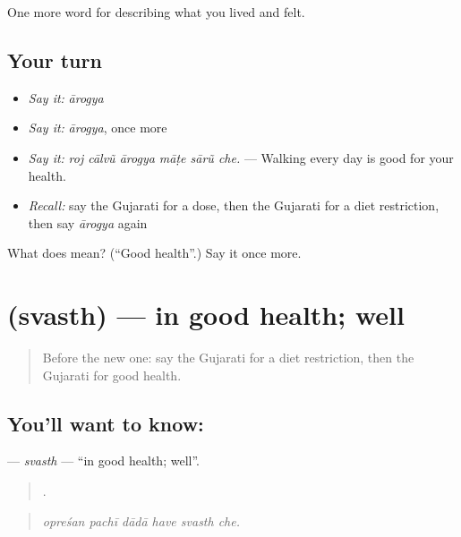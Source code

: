 \begin{grammarlens}[title={What you've built}]
One more word for describing what you lived and felt.
\end{grammarlens}

\subsection*{Your turn}
\begin{itemize}
\raggedright
  \item \emph{Say it:} \emph{ārogya}
  \item \emph{Say it:} \emph{ārogya}, once more
  \item \emph{Say it:} \emph{roj cālvũ ārogya māṭe sārũ che.} — Walking every day is good for your health.
  \item \emph{Recall:} say the Gujarati for a dose, then the Gujarati for a diet restriction, then say \emph{ārogya} again
\end{itemize}

\begin{tcolorbox}[breakable,colback=teal!4,colframe=teal!35!black,title={Before you move on}]
What does  mean? (\textquotedblleft{}Good health\textquotedblright{}.) Say it once more.
\end{tcolorbox}
\section[\texorpdfstring{\gu{સ્વસ્થ} (svasth)}{સ્વસ્થ (svasth)}]{ (svasth) — in good health; well}

\label{lesson:GU-C486-svasth}



\begin{quote}
Before the new one: say the Gujarati for a diet restriction, then the Gujarati for good health.
\end{quote}

\subsection*{You'll want to know: }
\textbf{} — \emph{svasth} — \textquotedblleft{}in good health; well\textquotedblright{}.

\begin{quote}
     .
\end{quote}

\begin{quote}
\emph{opreśan pachī dādā have svasth che.}
\end{quote}

